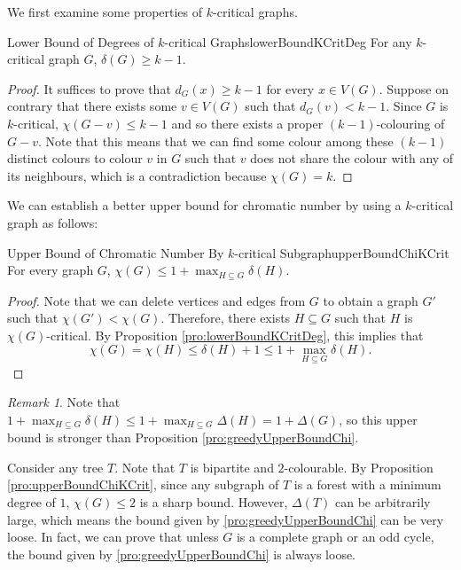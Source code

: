 \documentclass[math, code]{amznotes}
\theoremstyle{remark}
\newtheorem*{remark}{Remark}
\begin{document}
We first examine some properties of $k$-critical graphs.
\begin{probox}{Lower Bound of Degrees of $k$-critical Graphs}{lowerBoundKCritDeg}
    For any $k$-critical graph $G$, $\delta(G) \geq k - 1$.
    \tcblower
    \begin{proof}
        It suffices to prove that $d_G(x) \geq k - 1$ for every $x \in V(G)$. Suppose on contrary that there exists some $v \in V(G)$ such that $d_G(v) < k - 1$. Since $G$ is $k$-critical, $\chi(G - v) \leq k - 1$ and so there exists a proper $(k - 1)$-colouring of $G - v$. Note that this means that we can find some colour among these $(k - 1)$ distinct colours to colour $v$ in $G$ such that $v$ does not share the colour with any of its neighbours, which is a contradiction because $\chi(G) = k$.
    \end{proof}
\end{probox}
We can establish a better upper bound for chromatic number by using a $k$-critical graph as follows:
\begin{probox}{Upper Bound of Chromatic Number By $k$-critical Subgraph}{upperBoundChiKCrit}
    For every graph $G$, $\chi(G) \leq 1 + \max_{H \subseteq G}\delta(H)$.
    \tcblower
    \begin{proof}
        Note that we can delete vertices and edges from $G$ to obtain a graph $G'$ such that $\chi(G') < \chi(G)$. Therefore, there exists $H \subseteq G$ such that $H$ is $\chi(G)$-critical. By Proposition \ref{pro:lowerBoundKCritDeg}, this implies that
        \begin{equation*}
            \chi(G) = \chi(H) \leq \delta(H) + 1 \leq 1 + \max_{H \subseteq G}\delta(H).
        \end{equation*}
    \end{proof}
\end{probox}
\begin{notebox}
    \begin{remark}
        Note that $1 + \max_{H \subseteq G}\delta(H) \leq 1 + \max_{H \subseteq G}\Delta(H) = 1 + \Delta(G)$, so this upper bound is stronger than Proposition \ref{pro:greedyUpperBoundChi}.
    \end{remark}
\end{notebox}
Consider any tree $T$. Note that $T$ is bipartite and $2$-colourable. By Proposition \ref{pro:upperBoundChiKCrit}, since any subgraph of $T$ is a forest with a minimum degree of $1$, $\chi(G) \leq 2$ is a sharp bound. However, $\Delta(T)$ can be arbitrarily large, which means the bound given by \ref{pro:greedyUpperBoundChi} can be very loose. In fact, we can prove that unless $G$ is a complete graph or an odd cycle, the bound given by \ref{pro:greedyUpperBoundChi} is always loose.
\end{document}
